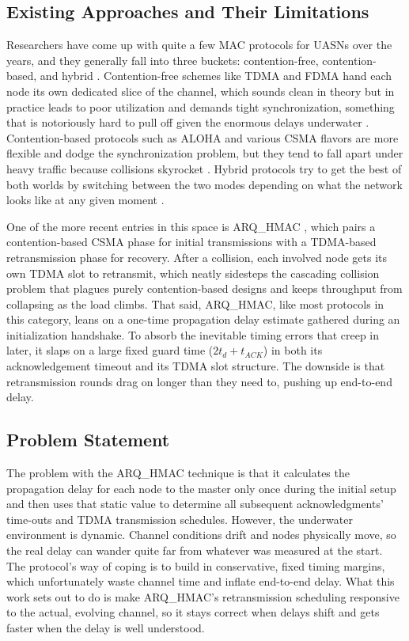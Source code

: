 \documentclass{article}
\begin{document}
\subsection{Existing Approaches and Their Limitations}
Researchers have come up with quite a few MAC protocols for UASNs over the years, and they generally fall into three buckets: contention-free, contention-based, and hybrid \cite{jiang2018,kulla2022}. Contention-free schemes like TDMA and FDMA hand each node its own dedicated slice of the channel, which sounds clean in theory but in practice leads to poor utilization and demands tight synchronization, something that is notoriously hard to pull off given the enormous delays underwater \cite{akyildiz2005,jiang2018}. Contention-based protocols such as ALOHA and various CSMA flavors are more flexible and dodge the synchronization problem, but they tend to fall apart under heavy traffic because collisions skyrocket \cite{jiang2018,kulla2022}. Hybrid protocols try to get the best of both worlds by switching between the two modes depending on what the network looks like at any given moment \cite{dao2025,jiang2018}.

One of the more recent entries in this space is ARQ\_HMAC \cite{dao2025}, which pairs a contention-based CSMA phase for initial transmissions with a TDMA-based retransmission phase for recovery. After a collision, each involved node gets its own TDMA slot to retransmit, which neatly sidesteps the cascading collision problem that plagues purely contention-based designs and keeps throughput from collapsing as the load climbs. That said, ARQ\_HMAC, like most protocols in this category, leans on a one-time propagation delay estimate gathered during an initialization handshake. To absorb the inevitable timing errors that creep in later, it slaps on a large fixed guard time ($2t_d + t_{ACK}$) in both its acknowledgement timeout and its TDMA slot structure. The downside is that retransmission rounds drag on longer than they need to, pushing up end-to-end delay.

\subsection{Problem Statement}
The problem with the ARQ\_HMAC technique is that it calculates the propagation delay for each node to the master only once during the initial setup and then uses that static value to determine all subsequent acknowledgments' time-outs and TDMA transmission schedules. However, the underwater environment is dynamic. Channel conditions drift and nodes physically move, so the real delay can wander quite far from whatever was measured at the start. The protocol's way of coping is to build in conservative, fixed timing margins, which unfortunately waste channel time and inflate end-to-end delay. What this work sets out to do is make ARQ\_HMAC's retransmission scheduling responsive to the actual, evolving channel, so it stays correct when delays shift and gets faster when the delay is well understood.
\end{document}
